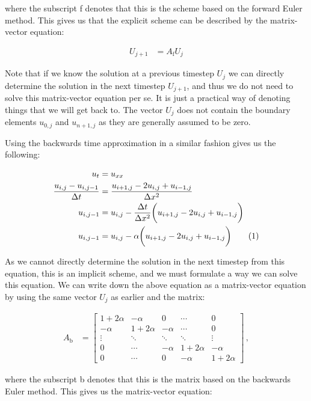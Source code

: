 \documentclass[reprint,english,notitlepage]{revtex4-1}  %
\newcommand\numberthis{\addtocounter{equation}{1}\tag{\theequation}}
\begin{document}
where the subscript f denotes that this is the scheme based on the forward Euler method. This gives us that the explicit scheme can be described by the matrix-vector equation:

\begin{align*}
U_{j+1} &= A_\text{f} U_{j}
\end{align*}

Note that if we know the solution at a previous timestep $U_j$ we can directly determine the solution in the next timestep $U_{j+1}$, and thus we do not need to solve this matrix-vector equation per se. It is just a practical way of denoting things that we will get back to. The vector $U_j$ does not contain the boundary elements $u_{0,j}$ and $u_{n+1,j}$ as they are generally assumed to be zero.

Using the backwards time approximation in a similar fashion gives us the following: 

\begin{align*}
u_t &= u_{xx} \\ 
\frac{u_{i,j} - u_{i,j-1}}{\Delta t} &= \frac{u_{i+1,j} - 2u_{i,j} + u_{i-1,j}}{\Delta x^2} \\
u_{i,j-1} &= u_{i,j} - \frac{\Delta t}{\Delta x^2} \bigg( u_{i+1,j} - 2u_{i,j} + u_{i-1,j} \bigg) \\
u_{i,j-1} &= u_{i,j} - \alpha \bigg( u_{i+1,j} - 2u_{i,j} + u_{i-1,j} \bigg) \numberthis \label{eq:backward_euler_method}
\end{align*}

As we cannot directly determine the solution in the next timestep from this equation, this is an implicit scheme, and we must formulate a way we can solve this equation. We can write down the above equation as a matrix-vector equation by using the same vector $U_j$ as earlier and the matrix:

\begin{align*}
A_\text{b} &= \begin{bmatrix}
1 + 2\alpha & -\alpha & 0   &\cdots & 0 \\
-\alpha & 1+2\alpha & -\alpha   & \cdots & 0 \\
\vdots & \ddots & \ddots & \ddots  & \vdots \\
0 & \cdots  & -\alpha & 1 + 2\alpha & -\alpha \\
0 & \cdots & 0 & -\alpha & 1 + 2\alpha 
\end{bmatrix} \, , 
\end{align*} 

where the subscript b denotes that this is the matrix based on the backwards Euler method. This gives us the matrix-vector equation:
\end{document}
